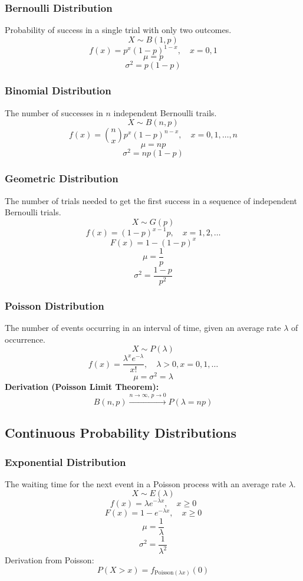 \documentclass{article}
\begin{document}
\subsubsection{Bernoulli Distribution}
Probability of success in a single trial with only two outcomes.
\[ X \sim B(1,p) \]
\[ f(x) = p^x (1-p)^{1-x}, \quad x=0,1 \]
\[ \mu = p \]
\[ \sigma^2 = p(1-p) \]

\subsubsection{Binomial Distribution}
The number of successes in \( n \) independent Bernoulli trails.
\[ X \sim B(n,p) \]
\[ f(x) = \binom{n}{x} p^x (1-p)^{n-x}, \quad x=0,1,\dots,n \]
\[ \mu = np \]
\[ \sigma^2 = np(1-p) \]

\subsubsection{Geometric Distribution}
The number of trials needed to get the first success in a sequence of independent Bernoulli trials.
\[ X \sim G(p) \]
\[ f(x) = (1-p)^{x-1}p, \quad x=1,2,\dots \]
\[ F(x) = 1 - (1-p)^x \]
\[ \mu = \frac{1}{p} \]
\[ \sigma^2 = \frac{1-p}{p^2} \]

\subsubsection{Poisson Distribution}
The number of events occurring in an interval of time, given an average rate \( \lambda \) of occurrence.
\[ X \sim P(\lambda) \]
\[ f(x) = \frac{\lambda^x e^{-\lambda}}{x!}, \quad \lambda>0, x=0,1,\dots \]
\[ \mu = \sigma^2 = \lambda \]
\textbf{Derivation (Poisson Limit Theorem):}
\[
    B(n, p) \xrightarrow{n \to \infty,\, p \to 0} P(\lambda = np)
\]

\subsection{Continuous Probability Distributions}

\subsubsection{Exponential Distribution}
The waiting time for the next event in a Poisson process with an average rate \( \lambda \).
\[ X \sim E(\lambda) \]
\[
    f(x) = \lambda e^{-\lambda x}, \quad x \geq 0
\]
\[
    F(x) = 1 - e^{-\lambda x}, \quad x \geq 0
\]
\[
    \mu = \frac{1}{\lambda}
\]
\[
    \sigma^2 = \frac{1}{\lambda^2}
\]
Derivation from Poisson:
\[
    P(X>x) = f_{\text{Poisson}(\lambda x)}(0)
\]
\end{document}
